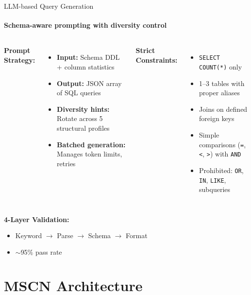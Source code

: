 \documentclass[aspectratio=169]{beamer}
\begin{document}
	\begin{frame}{LLM-based Query Generation}
		\framesubtitle{Schema-aware prompting with diversity control}
		\small
		\begin{columns}[T]
			\textbf{Prompt Strategy:}
			\begin{itemize}
				\item \textbf{Input:} Schema DDL + column statistics
				\item \textbf{Output:} JSON array of SQL queries
				\item \textbf{Diversity hints:} Rotate across 5 structural profiles
				\item \textbf{Batched generation:} Manages token limits, retries
			\end{itemize}
			
			\textbf{Strict Constraints:}
			\begin{itemize}
				\item \texttt{SELECT COUNT(*)} only
				\item 1--3 tables with proper aliases
				\item Joins on defined foreign keys
				\item Simple comparisons (\texttt{=}, \texttt{<}, \texttt{>}) with \texttt{AND}
				\item Prohibited: \texttt{OR}, \texttt{IN}, \texttt{LIKE}, subqueries
			\end{itemize}
		\end{columns}
		
		\vspace{0.3cm}
		\textbf{4-Layer Validation:}
		\begin{itemize}
			\item Keyword $\rightarrow$ Parse $\rightarrow$ Schema $\rightarrow$ Format
			\item $\sim$95\% pass rate
		\end{itemize}
	\end{frame}
	
	\section{MSCN Architecture}
	
\end{document}
